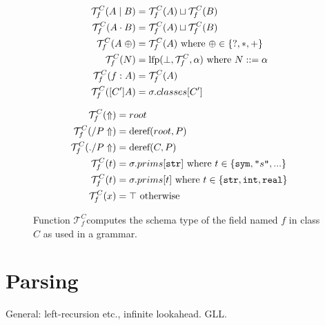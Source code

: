 \documentclass[a4paper]{article}
\begin{document}
\def\mytypejoin{\ensuremath{\sqcup}}
\def\mytypebottom{\ensuremath{\bot}}
\def\mytypetop{\ensuremath{\top}}
\def\typeof{\ensuremath{\mathcal{T}}}
\def\typeoff{\ensuremath{\typeof^C_f}}
\begin{figure}
\begin{minipage}[t]{0.4\textwidth}
\begin{align*}
\typeoff(A\mid B) &= \typeoff(A) \mytypejoin  \typeoff(B)\\
\typeoff(A\cdot B) &= \typeoff(A) \mytypejoin  \typeoff(B)\\
\typeoff(A\;\oplus) &= \typeoff(A) \text{ where } \oplus \in \{?, *, +\}\\
\typeoff(N) &= \fixpoint(\mytypebottom, \typeoff, \alpha) \text{ where } N ::= \alpha\\
\typeoff(f: A) &= \typeoff(A)\\
\typeoff([C'] A) &= \sigma.classes[C']\\
\end{align*}
\end{minipage}
\begin{minipage}[t]{0.6\textwidth}
\begin{align*}
\typeoff(\Uparrow) &= root\\
\typeoff(/P\Uparrow) &= \text{deref}(root, P)\\
\typeoff(./P\Uparrow) &= \text{deref}(C, P)\\
\typeoff(t) &= \sigma.prims[\text{\texttt{str}}] \text{ where } t\in\{\text{\texttt{sym}}, \literal{s}, ...\}\\
\typeoff(t) &= \sigma.prims[t] \text{ where } t\in \{\text{\texttt{str}}, \text{\texttt{int}}, \text{\texttt{real}} \}\\
\typeoff(x) &= \mytypetop \text{ otherwise}
\end{align*}
\end{minipage}
\caption{Function \typeoff computes the schema type of the field named
  $f$ in class $C$ as used in a grammar.\label{FIG:typeof}}
\end{figure}



\section{Parsing}

General: left-recursion etc., infinite lookahead. GLL. 
\end{document}
